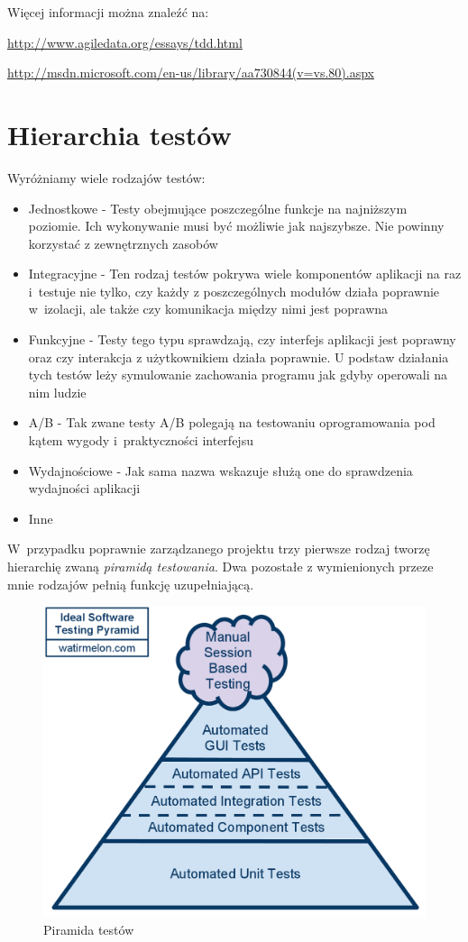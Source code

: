 \documentclass[brudnopis]{xmgr}
\begin{document}
Więcej informacji można znaleźć na:

\url{http://www.agiledata.org/essays/tdd.html}

\url{http://msdn.microsoft.com/en-us/library/aa730844(v=vs.80).aspx}

\section{Hierarchia testów}

Wyróżniamy wiele rodzajów testów:
\begin{itemize}
  \item Jednostkowe - Testy obejmujące poszczególne funkcje na najniższym poziomie. Ich wykonywanie musi być możliwie jak najszybsze. Nie powinny korzystać z zewnętrznych zasobów
  \item Integracyjne - Ten rodzaj testów pokrywa wiele komponentów aplikacji na raz i~testuje nie tylko, czy każdy z poszczególnych modułów działa poprawnie w~izolacji, ale także czy komunikacja między nimi jest poprawna
  \item Funkcyjne - Testy tego typu sprawdzają, czy interfejs aplikacji jest poprawny oraz czy interakcja z użytkownikiem działa poprawnie. U podstaw działania tych testów leży symulowanie zachowania programu jak gdyby operowali na nim ludzie 
  \item A/B - Tak zwane testy A/B polegają na testowaniu oprogramowania pod kątem wygody i~praktyczności interfejsu
  \item Wydajnościowe - Jak sama nazwa wskazuje służą one do sprawdzenia wydajności aplikacji
  \item Inne
\end{itemize}

W~przypadku poprawnie zarządzanego projektu trzy pierwsze rodzaj tworzę hierarchię zwaną \textit{piramidą testowania}. Dwa pozostałe z wymienionych przeze mnie rodzajów pełnią funkcję uzupełniającą. 

\begin{figure}[h]
    \centering
    \includegraphics[scale=0.25]{idealautomatedtestingpyramid.png}
    \caption{Piramida testów}
    \label{fig:pyramis}
\end{figure}
\end{document}
